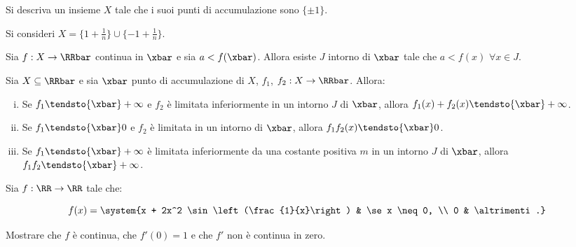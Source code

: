 \documentclass[11pt]{article}
\begin{document}
	\begin{exercise}
		Si descriva un insieme $X$ tale che i suoi punti di accumulazione
		sono $\{\pm 1\}$.
	\end{exercise}

	\begin{solution}
		Si consideri $X = \{1 + \frac{1}{n}\} \cup \{-1 + \frac{1}{n}\}$.
	\end{solution}

	\begin{exercise}
		Sia $f : X \to \RRbar$ continua in $\xbar$ e sia $a < f(\xbar)$.
		Allora esiste $J$ intorno di $\xbar$ tale che $a < f(x)$ $\forall
		x \in J$.
	\end{exercise}

	\begin{exercise}
		Sia $X \subseteq \RRbar$ e sia $\xbar$ punto di accumulazione di $X$,
		$f_1$, $f_2 : X \to \RRbar$. Allora:
		
	\begin{enumerate}[(i)]
		\item Se $f_1 \tendsto{\xbar} +\infty$ e $f_2$ è limitata inferiormente
		in un intorno $J$ di $\xbar$, allora $f_1(x) + f_2(x) \tendsto{\xbar} +\infty$.
		\item Se $f_1 \tendsto{\xbar} 0$ e $f_2$ è limitata in un intorno
		di $\xbar$, allora $f_1 f_2(x) \tendsto{\xbar} 0$.
		\item Se $f_1 \tendsto{\xbar} +\infty$ è limitata inferiormente
		da una costante positiva $m$ in un intorno $J$ di $\xbar$, allora
		$f_1 f_2 \tendsto{\xbar} +\infty$. 
	\end{enumerate}
	\end{exercise}

	\begin{exercise}
		Sia $f: \RR \to \RR$ tale che:
		
		\[ f(x) = \system{x + 2x^2 \sin\left(\frac{1}{x}\right) & \se x \neq 0, \\ 0 & \altrimenti.} \]
		
		\vskip 0.05in
		
		Mostrare che $f$ è continua, che $f'(0) = 1$ e che $f'$ non è continua in zero.
	\end{exercise}
\end{document}
